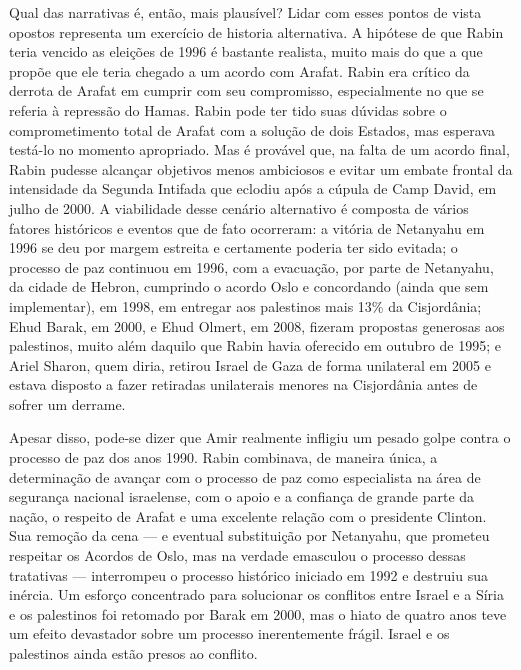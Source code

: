 Qual das narrativas é, então, mais plausível? Lidar com esses pontos de
vista opostos representa um exercício de historia alternativa. A
hipótese de que Rabin teria vencido as eleições de 1996 é bastante
realista, muito mais do que a que propõe que ele teria chegado a um acordo
com Arafat. Rabin era crítico da derrota de Arafat em cumprir com seu
compromisso, especialmente no que se referia à repressão do Hamas.
Rabin pode ter tido suas dúvidas sobre o comprometimento total de Arafat
com a solução de dois Estados, mas esperava testá-lo no momento
apropriado. Mas é provável que, na falta de um acordo final, Rabin
pudesse alcançar objetivos menos ambiciosos e evitar um embate frontal da
intensidade da Segunda Intifada que eclodiu após a cúpula de Camp David,
em julho de 2000. A viabilidade desse cenário alternativo é composta de
vários fatores históricos e eventos que de fato ocorreram: a vitória de
Netanyahu em 1996 se deu por margem estreita e certamente poderia ter sido
evitada; o processo de paz continuou em 1996, com a evacuação, por parte
de Netanyahu, da cidade de Hebron, cumprindo o acordo Oslo  e
concordando (ainda que sem implementar), em 1998, em entregar aos palestinos
mais 13\% da Cisjordânia; Ehud Barak, em 2000, e Ehud Olmert, em 2008,
fizeram propostas generosas aos palestinos, muito além daquilo que Rabin
havia oferecido em outubro de 1995; e Ariel Sharon, quem diria, retirou
Israel de Gaza de forma unilateral em 2005 e estava disposto a fazer
retiradas unilaterais menores na Cisjordânia antes de sofrer um derrame.

Apesar disso, pode-se dizer que Amir realmente infligiu um pesado
golpe contra o processo de paz dos anos 1990. Rabin combinava, de
maneira única, a determinação de avançar com o processo de paz como
especialista na área de segurança nacional israelense, com o apoio e a
confiança de grande parte da nação, o respeito de Arafat e
uma excelente relação com o presidente Clinton. Sua remoção da cena --- e
eventual substituição por Netanyahu, que prometeu respeitar os Acordos
de Oslo, mas na verdade emasculou o processo dessas tratativas --- interrompeu o
processo histórico iniciado em 1992 e destruiu sua inércia. Um esforço
concentrado para solucionar os conflitos entre Israel e a Síria e os
palestinos foi retomado por Barak em 2000, mas o hiato de quatro anos
teve um efeito devastador sobre um processo inerentemente frágil. Israel
e os palestinos ainda estão presos ao conflito.

